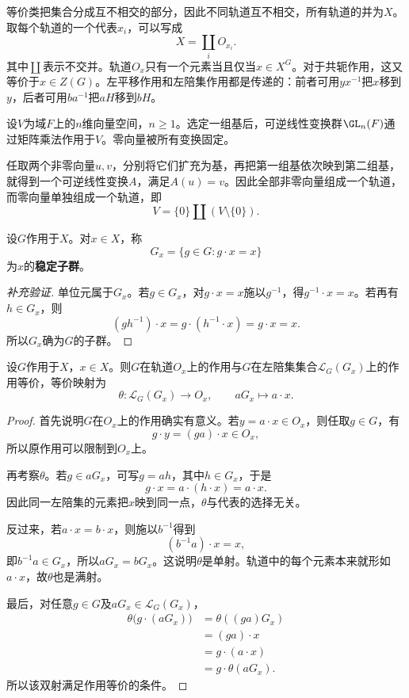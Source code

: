 等价类把集合分成互不相交的部分，因此不同轨道互不相交，所有轨道的并为$X$。取每个轨道的一个代表$x_i$，可以写成
\[
X=\coprod_i O_{x_i}.
\]
其中$\coprod$表示不交并。轨道$O_x$只有一个元素当且仅当$x\in X^G$。对于共轭作用，这又等价于$x\in Z(G)$。左平移作用和左陪集作用都是传递的：前者可用$yx^{-1}$把$x$移到$y$，后者可用$ba^{-1}$把$aH$移到$bH$。

\begin{example}
设$V$为域$F$上的$n$维向量空间，$n\geq1$。选定一组基后，可逆线性变换群$\GL_n(F)$通过矩阵乘法作用于$V$。零向量被所有变换固定。

任取两个非零向量$u,v$，分别将它们扩充为基，再把第一组基依次映到第二组基，就得到一个可逆线性变换$A$，满足$A(u)=v$。因此全部非零向量组成一个轨道，而零向量单独组成一个轨道，即
\[
V=\{0\}\coprod(V\setminus\{0\}).
\]
\end{example}

\begin{definition}
设$G$作用于$X$。对$x\in X$，称
\[
G_x=\{g\in G:g\cdot x=x\}
\]
为$x$的\textbf{稳定子群}。
\end{definition}
\begin{proof}[补充验证]
单位元属于$G_x$。若$g\in G_x$，对$g\cdot x=x$施以$g^{-1}$，得$g^{-1}\cdot x=x$。若再有$h\in G_x$，则
\[
(gh^{-1})\cdot x=g\cdot(h^{-1}\cdot x)=g\cdot x=x.
\]
所以$G_x$确为$G$的子群。
\end{proof}

\begin{theorem}\label{p2:orbit-stabilizer}
设$G$作用于$X$，$x\in X$。则$G$在轨道$O_x$上的作用与$G$在左陪集集合$\mathcal L_G(G_x)$上的作用等价，等价映射为
\[
\theta:\mathcal L_G(G_x)\longrightarrow O_x,
\qquad aG_x\longmapsto a\cdot x.
\]
\end{theorem}
\begin{proof}
首先说明$G$在$O_x$上的作用确实有意义。若$y=a\cdot x\in O_x$，则任取$g\in G$，有
\[
g\cdot y=(ga)\cdot x\in O_x,
\]
所以原作用可以限制到$O_x$上。

再考察$\theta$。若$g\in aG_x$，可写$g=ah$，其中$h\in G_x$，于是
\[
g\cdot x=a\cdot(h\cdot x)=a\cdot x.
\]
因此同一左陪集的元素把$x$映到同一点，$\theta$与代表的选择无关。

反过来，若$a\cdot x=b\cdot x$，则施以$b^{-1}$得到
\[
(b^{-1}a)\cdot x=x,
\]
即$b^{-1}a\in G_x$，所以$aG_x=bG_x$。这说明$\theta$是单射。轨道中的每个元素本来就形如$a\cdot x$，故$\theta$也是满射。

最后，对任意$g\in G$及$aG_x\in\mathcal L_G(G_x)$，
\begin{align*}
\theta\bigl(g\cdot(aG_x)\bigr)
&=\theta((ga)G_x)\\
&=(ga)\cdot x\\
&=g\cdot(a\cdot x)\\
&=g\cdot\theta(aG_x).
\end{align*}
所以该双射满足作用等价的条件。
\end{proof}

